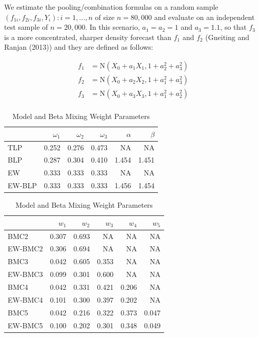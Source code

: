 \documentclass[
]{article}
\begin{document}
We estimate the pooling/combination formulas on a random sample
\({(f_{1i} , f_{2i} , f_{3i}, Y_i) : i = 1,..., n}\) of size
\(n = 80,000\) and evaluate on an independent test sample of
\(n=20,000\). In this scenario, \(a_1 = a_2 = 1\) and \(a_3 = 1.1\), so
that \(f_3\) is a more concentrated, sharper density forecast than
\(f_1\) and \(f_2\) (Gneiting and Ranjan (2013)) and they are defined as
follows:

\[
\begin{aligned}
f_1&=\text{N}(X_0+a_1X_1,1+a^2_2+a^2_3)\\
f_2&=\text{N}(X_0+a_2X_2,1+a^2_1+a^2_3)\\
f_3&=\text{N}(X_0+a_3X_3,1+a^2_1+a^2_2)\\
\end{aligned}
\]

\begin{table}[H]
\caption{\label{tab:unnamed-chunk-5}Model and Beta Mixing Weight Parameters}

\centering
\fontsize{8}{10}\selectfont
\begin{tabular}[t]{lrrrrr}
\toprule
  & $\omega_1$ & $\omega_2$ & $\omega_3$ & $\alpha$ & $\beta$\\
\midrule
TLP & 0.252 & 0.276 & 0.473 & NA & NA\\
BLP & 0.287 & 0.304 & 0.410 & 1.454 & 1.451\\
EW & 0.333 & 0.333 & 0.333 & NA & NA\\
EW-BLP & 0.333 & 0.333 & 0.333 & 1.456 & 1.454\\
\bottomrule
\end{tabular}
\centering
\begin{tabular}[t]{lrrrrr}
\toprule
  & $w_1$ & $w_2$ & $w_3$ & $w_4$ & $w_5$\\
\midrule
BMC2 & 0.307 & 0.693 & NA & NA & NA\\
EW-BMC2 & 0.306 & 0.694 & NA & NA & NA\\
BMC3 & 0.042 & 0.605 & 0.353 & NA & NA\\
EW-BMC3 & 0.099 & 0.301 & 0.600 & NA & NA\\
BMC4 & 0.042 & 0.331 & 0.421 & 0.206 & NA\\
\addlinespace
EW-BMC4 & 0.101 & 0.300 & 0.397 & 0.202 & NA\\
BMC5 & 0.042 & 0.216 & 0.322 & 0.373 & 0.047\\
EW-BMC5 & 0.100 & 0.202 & 0.301 & 0.348 & 0.049\\
\bottomrule
\end{tabular}
\end{table}
\end{document}
